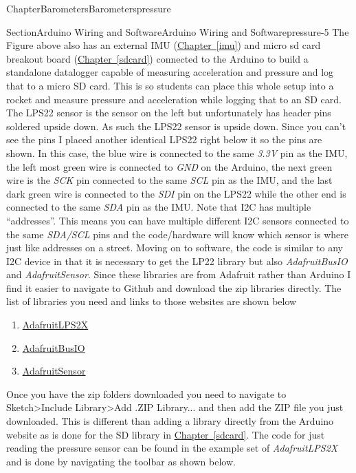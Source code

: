 \documentclass[oneside,10pt,]{book}
\newcommand{\xreffont}{\relax}
\newcommand{\linkhilite}[1]{\underline{#1}}
\numberwithin{equation}{section}
\begin{document}
\begin{chapterptx}{Chapter}{Barometers}{}{Barometers}{}{}{pressure}
\begin{sectionptx}{Section}{Arduino Wiring and Software}{}{Arduino Wiring and Software}{}{}{pressure-5}
The Figure above also has an external IMU (\hyperref[imu]{\linkhilite{Chapter~{\xreffont\ref{imu}}}}) and micro sd card breakout board (\hyperref[sdcard]{\linkhilite{Chapter~{\xreffont\ref{sdcard}}}}) connected to the Arduino to build a standalone datalogger capable of measuring acceleration and pressure and log that to a micro SD card. This is so students can place this whole setup into a rocket and measure pressure and acceleration while logging that to an SD card. The LPS22 sensor is the sensor on the left but unfortunately has header pins soldered upside down. As such the LPS22 sensor is upside down. Since you can't see the pins I placed another identical LPS22 right below it so the pins are shown. In this case, the blue wire is connected to the same \emph{3.3V} pin as the IMU, the left most green wire is connected to \emph{GND} on the Arduino, the next green wire is the \emph{SCK} pin connected to the same \emph{SCL} pin as the IMU, and the last dark green wire is connected to the \emph{SDI} pin on the LPS22 while the other end is connected to the same \emph{SDA} pin as the IMU. Note that I2C has multiple \textquotedblleft{}addresses\textquotedblright{}. This means you can have multiple different I2C sensors connected to the same \emph{SDA\slash{}SCL} pins and the code\slash{}hardware will know which sensor is where just like addresses on a street. Moving on to software, the code is similar to any I2C device in that it is necessary to get the LP22 library but also \emph{Adafruit\textunderscore{}BusIO} and \emph{Adafruit\textunderscore{}Sensor}. Since these libraries are from Adafruit rather than Arduino I find it easier to navigate to Github and download the zip libraries directly. The list of libraries you need and links to those websites are shown below%
%
\begin{enumerate}
\item{}\href{https://github.com/adafruit/Adafruit_LPS2X}{\linkhilite{Adafruit\textunderscore{}LPS2X}}%
\item{}\href{https://github.com/adafruit/Adafruit_BusIO}{\linkhilite{Adafruit\textunderscore{}BusIO}}%
\item{}\href{https://github.com/adafruit/adafruit_sensor}{\linkhilite{Adafruit\textunderscore{}Sensor}}%
\end{enumerate}
Once you have the zip folders downloaded you need to navigate to Sketch\textgreater{}Include Library\textgreater{}Add .ZIP Library... and then add the ZIP file you just downloaded. This is different than adding a library directly from the Arduino website as is done for the SD library in \hyperref[sdcard]{\linkhilite{Chapter~{\xreffont\ref{sdcard}}}}. The code for just reading the pressure sensor can be found in the example set of \emph{Adafruit\textunderscore{}LPS2X} and is done by navigating the toolbar as shown below.%

\end{sectionptx}
\end{chapterptx}
\end{document}

